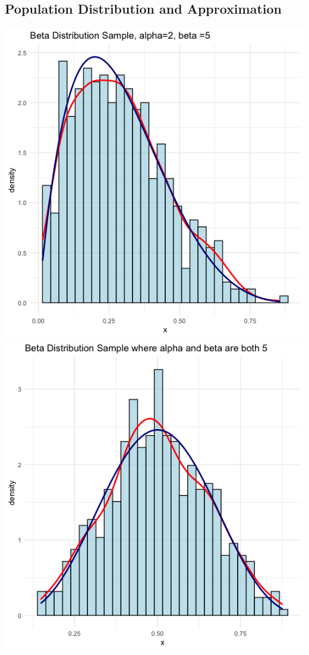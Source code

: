 \documentclass{article}\usepackage[]{graphicx}\usepackage[]{xcolor}
\begin{document}
\subsection{Population Distribution and Approximation}
\includegraphics[scale=0.3]{beta distribution alpha 2 beta 5 with sample data.png}
\includegraphics[scale=0.3]{beta distribution with alpha 5 beta 5 with sample data.png}\\
\end{document}
